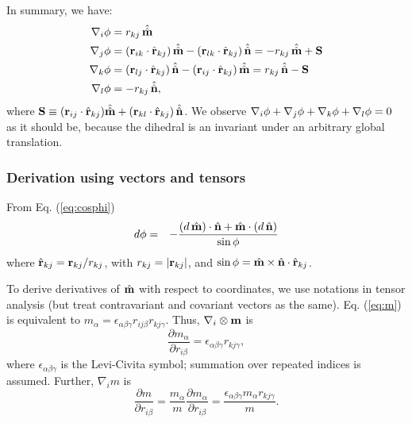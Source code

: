 \documentclass{article}
\begin{document}
In summary, we have:
\begin{equation}
\begin{split}
\nabla_i \phi   &=  r_{kj} \, \hat{\hat{\mathbf{m}}}  \\
\nabla_j \phi   &=  (\mathbf{r}_{ik} \cdot \hat{\mathbf{r}}_{kj}) \, \hat{\hat{\mathbf{m}}} - (\mathbf{r}_{lk} \cdot \hat{\mathbf{r}}_{kj}) \, \hat{\hat{\mathbf{n}}}
         = -r_{kj} \, \hat{\hat{\mathbf{m}}} + \mathbf{S} \\
\nabla_k \phi   &=  (\mathbf{r}_{lj} \cdot \hat{\mathbf{r}}_{kj}) \, \hat{\hat{\mathbf{n}}} - (\mathbf{r}_{ij} \cdot \hat{\mathbf{r}}_{kj}) \, \hat{\hat{\mathbf{m}}}
         =  r_{kj} \, \hat{\hat{\mathbf{n}}} - \mathbf{S} \\
\nabla_l \phi   &= -r_{kj} \, \hat{\hat{\mathbf{n}}},
\end{split}
\label{eq:gradall}
\end{equation}
where $\mathbf{S} \equiv (\mathbf{r}_{ij}\cdot \hat{\mathbf{r}}_{kj}) \hat{\hat{\mathbf{m}}} + (\mathbf{r}_{kl} \cdot \hat{\mathbf{r}}_{kj}) \, \hat{\hat{\mathbf{n}}}$.
We observe $\nabla_i \phi + \nabla_j \phi + \nabla_k \phi + \nabla_l \phi = 0$ as it should be,
because the dihedral is an invariant under an arbitrary global translation.




\subsubsection{Derivation using vectors and tensors}

From Eq. (\ref{eq:cosphi})
\begin{eqnarray*}
d \phi  &=&  -\frac{ (d\,\hat{\mathbf{m}}) \cdot \hat{\mathbf{n}} + \hat{\mathbf{m}} \cdot (d\,\hat{\mathbf{n}}) } {\sin \phi}
\end{eqnarray*}
where
$\hat{\mathbf{r}}_{kj} = \mathbf{r}_{kj}/r_{kj}$, with $r_{kj} = |\mathbf{r}_{kj}|$,
and
$\sin\phi = \hat{\mathbf{m}} \times \hat{\mathbf{n}} \cdot \hat{\mathbf{r}}_{kj} $.

To derive derivatives of $\hat{\mathbf{m}}$ with respect to coordinates,
we use notations in tensor analysis (but treat contravariant and covariant vectors as the same).
Eq. (\ref{eq:m}) is equivalent to
$m_\alpha = \epsilon_{\alpha \beta \gamma} r_{ij \beta} r_{kj \gamma}$.
%
Thus,
$\nabla_i \otimes \mathbf{m}$
is
\begin{equation}
  \frac {\partial m_\alpha} {\partial r_{i \beta}}
  = \epsilon_{\alpha \beta \gamma} r_{k j \gamma},
  \label{eq:dmadrib}
\end{equation}
where $\epsilon_{\alpha \beta \gamma}$ is the Levi-Civita symbol;
%
summation over repeated indices is assumed.
%
Further,
$\nabla_i m$ is
\begin{equation}
    \frac {\partial m} {\partial r_{i  \beta}}
  = \frac {m_\alpha}{m} \frac {\partial m_\alpha} {\partial r_{i \beta}}
  = \frac {\epsilon_{\alpha \beta \gamma} m_\alpha r_{k j \gamma}}{m}.
  \label{eq:dmdrib}
\end{equation}
%
\end{document}
